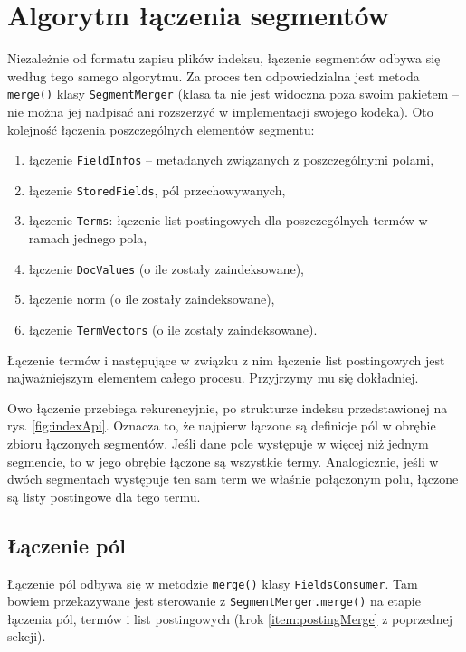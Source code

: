\chapter{Algorytm łączenia segmentów}

Niezależnie od formatu zapisu plików indeksu, łączenie segmentów odbywa się według tego samego algorytmu. Za proces ten odpowiedzialna jest metoda \texttt{merge()} klasy \texttt{SegmentMerger} (klasa ta nie jest widoczna poza swoim pakietem -- nie można jej nadpisać ani rozszerzyć w implementacji swojego kodeka). Oto kolejność łączenia poszczególnych elementów segmentu:
\begin{enumerate}
 \item łączenie \texttt{FieldInfos} -- metadanych związanych z poszczególnymi polami,
 \item łączenie \texttt{StoredFields}, pól przechowywanych,
 \item \label{item:postingMerge} łączenie \texttt{Terms}: łączenie list postingowych dla poszczególnych termów w ramach jednego pola,
 \item łączenie \texttt{DocValues} (o ile zostały zaindeksowane),
 \item łączenie norm (o ile zostały zaindeksowane),
 \item łączenie \texttt{TermVectors} (o ile zostały zaindeksowane).
\end{enumerate}

%
Łączenie termów i następujące w związku z nim łączenie list postingowych jest najważniejszym elementem całego procesu. Przyjrzymy mu się dokładniej.

Owo łączenie przebiega rekurencyjnie, po strukturze indeksu przedstawionej na rys. \ref{fig:indexApi}. Oznacza to, że najpierw łączone są definicje pól w obrębie zbioru łączonych segmentów. Jeśli dane pole występuje w więcej niż jednym segmencie, to w jego obrębie łączone są wszystkie termy. Analogicznie, jeśli w dwóch segmentach występuje ten sam term we właśnie połączonym polu, łączone są listy postingowe dla tego termu.

\section{Łączenie pól}

Łączenie pól odbywa się w metodzie \texttt{merge()} klasy \texttt{FieldsConsumer}. Tam bowiem przekazywane jest sterowanie z \texttt{SegmentMerger.merge()} na etapie łączenia pól, termów i list postingowych (krok \ref{item:postingMerge} z poprzednej sekcji). 

